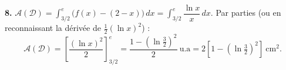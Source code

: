 \documentclass[11pt]{article}
\begin{document}
\textbf{8.} $\mathcal{A}(\mathcal{D}) = \displaystyle\int_{3/2}^{e}\big(f(x) - (2-x)\big)\,dx = \int_{3/2}^{e}\dfrac{\ln x}{x}\,dx$. Par parties (ou en reconnaissant la dérivée de $\tfrac{1}{2}(\ln x)^2$) :
\[ \mathcal{A}(\mathcal{D}) = \left[\frac{(\ln x)^2}{2}\right]_{3/2}^{e} = \frac{1 - \left(\ln\frac{3}{2}\right)^2}{2}\ \text{u.a} = 2\left[1 - \left(\ln\tfrac{3}{2}\right)^2\right]\ \text{cm}^2. \]
\end{document}
